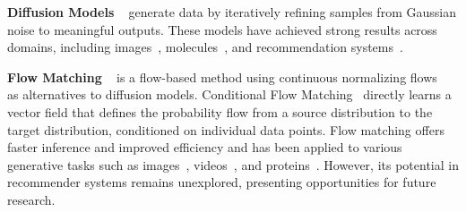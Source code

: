 \noindent \textbf{Diffusion Models}  
~\cite{sohl2015deep, song2019generative, ho2020denoising, song2020score} generate data by iteratively refining samples from Gaussian noise to meaningful outputs. These models have achieved strong results across domains, including images~\cite{ho2020denoising, rombach2022high}, molecules~\cite{xu2022geodiff, jing2022torsional}, and recommendation systems~\cite{lin2024survey, li2023diffurec, yang2024generate}. 

\noindent \textbf{Flow Matching}
~\cite{lipman2022flow, liu2022flow, albergo2022building} is a flow-based method using continuous normalizing flows~\cite{chen2018neural} as alternatives to diffusion models. Conditional Flow Matching~\cite{lipman2022flow, tong2023improving} directly learns a vector field that defines the probability flow from a source distribution to the target distribution, conditioned on individual data points. Flow matching offers faster inference and improved efficiency and has been applied to various generative tasks such as images~\cite{esser2403scaling}, videos~\cite{polyak2024movie}, and proteins~\cite{bose2023se}. However, its potential in recommender systems remains unexplored, presenting opportunities for future research.  

\vspace{-2pt}
